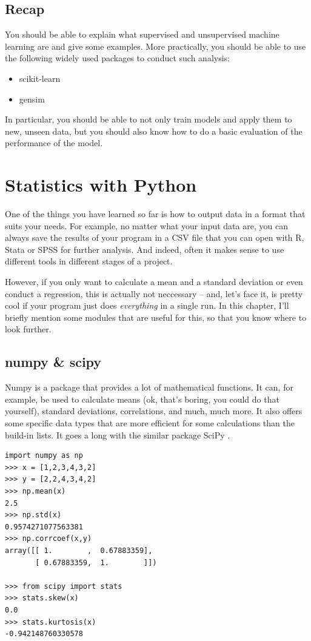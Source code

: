 \documentclass[a4paper,12pt]{book}
\begin{document}
\section{Recap}
You should be able to explain what supervised and unsupervised machine learning are and give some examples. More practically, you should be able to use the following widely used packages to conduct such analysis:
\begin{itemize}
	\item scikit-learn
	\item gensim
\end{itemize}
In particular, you should be able to not only train models and apply them to new, unseen data, but you should also know how to do a basic evaluation of the performance of the model.



\chapter{Statistics with Python}
\label{chap:statistics}
One of the things you have learned so far is how to output data in a format that suits your needs. For example, no matter what your input data are, you can always save the results of your program in a CSV file that you can open with R, Stata or SPSS for further analysis. And indeed, often it makes sense to use different tools in different stages of a project.

However, if you only want to calculate a mean and a standard deviation or even conduct a regression, this is actually not neccessary -- and, let's face it, is pretty cool if your program just does \emph{everything} in a single run. In this chapter, I'll briefly mention some modules that are useful for this, so that you know where to look further.


\section{numpy \& scipy}
Numpy \citep{numpy} is a package that provides a lot of mathematical functions. It can, for example, be used to calculate means (ok, that's boring, you could do that yourself), standard deviations, correlations, and much, much more. It also offers some specific data types that are more efficient for some calculations than the build-in lists. It goes a long with the similar package SciPy \citep{scipy}.



\begin{lstlisting}
import numpy as np
>>> x = [1,2,3,4,3,2]
>>> y = [2,2,4,3,4,2]
>>> np.mean(x)
2.5
>>> np.std(x)
0.9574271077563381
>>> np.corrcoef(x,y)
array([[ 1.        ,  0.67883359],
       [ 0.67883359,  1.        ]])

>>> from scipy import stats
>>> stats.skew(x)
0.0
>>> stats.kurtosis(x)
-0.942148760330578
\end{lstlisting}
\end{document}
